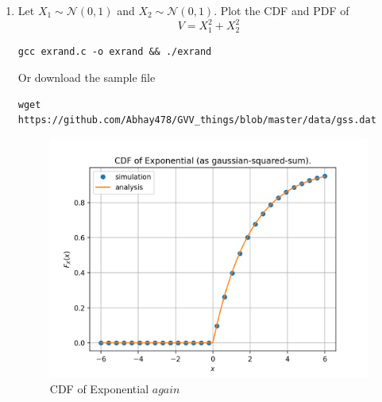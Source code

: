 \documentclass[journal,12pt,twocolumn]{IEEEtran}
\renewcommand\thesection{\arabic{section}}
\theoremstyle{remark}
\providecommand{\gauss}[2]{\mathcal{N}\ensuremath{\left(#1,#2\right)}}
\numberwithin{equation}{section}
\numberwithin{equation}{section}
\begin{document}
\begin{enumerate}[label=\thesection.\arabic*,ref=\thesection.\theenumi]
\item
Let $X_1 \sim  \gauss{0}{1}$ and $X_2 \sim  \gauss{0}{1}$. Plot the CDF and PDF of
%
\begin{equation}
V = X_1^2 + X_2^2 
\end{equation}

    
    \begin{lstlisting}
gcc exrand.c -o exrand && ./exrand
    \end{lstlisting}

Or download the sample file
\begin{lstlisting}
wget https://github.com/Abhay478/GVV_things/blob/master/data/gss.dat   
\end{lstlisting}

\begin{figure}[!h]
    \caption{CDF of Exponential \(again\)}
    \includegraphics[width = \columnwidth]{gss.png}
\end{figure}


\end{enumerate}
\end{document}
